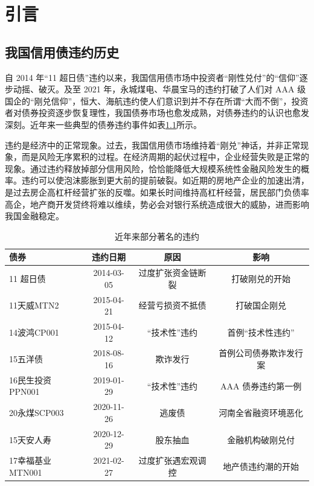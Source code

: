 
\chapter{引言}

\section{我国信用债违约历史}

自 2014 年“11 超日债”违约以来，我国信用债市场中投资者“刚性兑付”的“信仰”逐步动摇、破灭。及至 2021 年，永城煤电、华晨宝马的违约打破了人们对 AAA 级国企的“刚兑信仰”，恒大、海航违约使人们意识到并不存在所谓“大而不倒”，投资者对债券投资逐步恢复理性，我国债券市场也愈发成熟，对债券违约的认识也愈发深刻。近年来一些典型的债券违约事件如表\ref{tab:defaults_in_history}所示。

违约是经济中的正常现象。过去，我国信用债市场维持着“刚兑”神话，并非正常现象，而是风险无序累积的过程。在经济周期的起伏过程中，企业经营失败是正常的现象。通过违约释放掉部分信用风险，恰恰能降低大规模系统性金融风险发生的概率。违约可以使泡沫膨胀到更大前的提前破裂。如近期的房地产企业的加速出清，是过去房企高杠杆经营扩张的反噬。如果长时间维持高杠杆经营，居民部门负债率高企，地产商开发贷终将难以维续，势必会对银行系统造成很大的威胁，进而影响我国金融稳定。
\begin{table}[h]
	\caption{近年来部分著名的违约}
	\centering
	\begin{tabular}{lccc}
		债券             & 违约日期   & 原因               & 影响                   \\ \hline
		11 超日债        & 2014-03-05 & 过度扩张资金链断裂 & 打破刚兑的开始         \\
		11天威MTN2       & 2015-04-21 & 经营亏损资不抵债   & 打破国企刚兑           \\
		14波鸿CP001      & 2015-04-12 & “技术性”违约       & 首例“技术性违约”       \\
		15五洋债         & 2018-08-16 & 欺诈发行           & 首例公司债券欺诈发行案 \\
		16民生投资PPN001 & 2019-01-29 & “技术性”违约       & AAA 债券违约第一例     \\
		20永煤SCP003     & 2020-11-26 & 逃废债             & 河南全省融资环境恶化   \\
		15天安人寿       & 2020-12-29 & 股东抽血           & 金融机构破刚兑付       \\
		17幸福基业MTN001 & 2021-02-27 & 过度扩张遇宏观调控 & 地产债违约潮的开始     \\
	\end{tabular}
	\label{tab:defaults_in_history}
\end{table}


